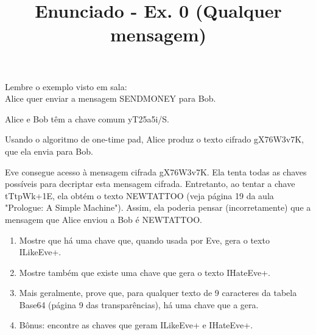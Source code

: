 \documentclass{article}
\title{Enunciado - Ex. 0 (Qualquer mensagem)}
\date{}
\author{}
\begin{document}
Lembre o exemplo visto em sala:\\

Alice quer enviar a mensagem SENDMONEY para Bob.

Alice e Bob t\^em a chave comum yT25a5i/S.

Usando o algoritmo de one-time pad, Alice produz o texto cifrado gX76W3v7K, que ela envia para Bob.

Eve consegue acesso \`a mensagem cifrada gX76W3v7K. Ela tenta todas as chaves poss\'iveis para decriptar esta mensagem cifrada. Entretanto, ao tentar a chave tTtpWk+1E, ela obt\'em o texto NEWTATTOO (veja p\'agina 19 da aula "Prologue: A Simple Machine"). Assim, ela poderia pensar (incorretamente) que a mensagem que Alice enviou a Bob \'e NEWTATTOO.

	\begin{enumerate}
		\item Mostre que h\'a uma chave que, quando usada por Eve, gera o texto ILikeEve+.
		\item Mostre tamb\'em que existe uma chave que gera o texto IHateEve+.
		\item Mais geralmente, prove que, para qualquer texto de 9 caracteres da tabela Base64 (página 9 das transparências), h\'a uma chave que a gera.
		\item B\^onus: encontre as chaves que geram ILikeEve+ e IHateEve+.
	\end{enumerate}
\end{document}
